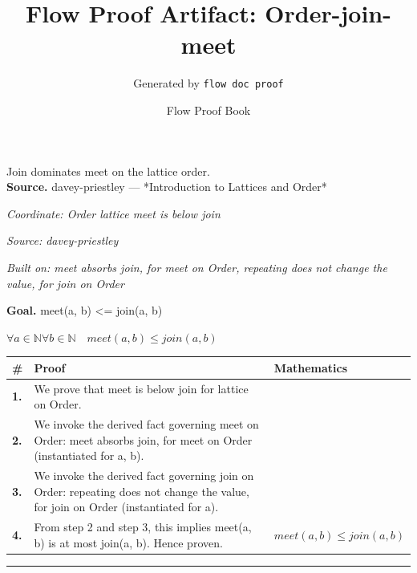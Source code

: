 \documentclass[11pt]{article}
\title{Flow Proof Artifact: Order-join-meet}
\author{Generated by \texttt{flow doc proof}}
\date{Flow Proof Book}
\theoremstyle{definition}
\begin{document}
\maketitle
Join dominates meet on the lattice order.\\[0.5em]
\textbf{Source.} davey-priestley — *Introduction to Lattices and Order*\\[0.5em]
\bigskip
{}\par
\smallskip\noindent\textit{Coordinate: Order \cdot lattice \cdot meet is below join}\par
\smallskip\noindent\textit{Source: davey-priestley}\par
\smallskip\noindent\textit{Built on: meet absorbs join, for meet on Order, repeating does not change the value, for join on Order}\par
\medskip
\noindent\textbf{Goal.} meet(a, b) <= join(a, b)\par
\noindent$\displaystyle \forall a \in \mathbb{N} \forall b \in \mathbb{N}\quad meet(a, b) \le join(a, b)$\par
\medskip
\noindent
\begin{tabular}{@{} >{\raggedright\arraybackslash}p{} >{\raggedright\arraybackslash}p{} >{\raggedleft\arraybackslash}p{} @{}}
\textbf{\#} & \textbf{Proof} & \textbf{Mathematics} \\
\midrule
\textbf{1.} & We prove that meet is below join for lattice on Order. & \\[0.45em]
\textbf{2.} & We invoke the derived fact governing meet on Order: meet absorbs join, for meet on Order (instantiated for a, b). & \\[0.45em]
\textbf{3.} & We invoke the derived fact governing join on Order: repeating does not change the value, for join on Order (instantiated for a). & \\[0.45em]
\textbf{4.} & From step 2 and step 3, this implies meet(a, b) is at most join(a, b). Hence proven. & $\displaystyle meet(a, b) \le join(a, b)$ \\[0.45em]
\bottomrule
\end{tabular}
\label{thm:Order-lattice-meet_is_below_join}
\par\medskip\hrule
\end{document}
